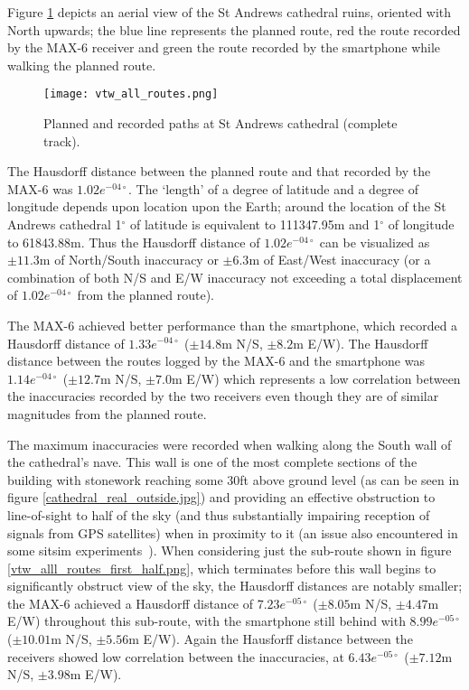 Figure \ref{vtw_all_routes.png} depicts an aerial view of the St Andrews cathedral ruins, oriented with North upwards; the blue line represents the planned route, red the route recorded by the MAX-6 receiver and green the route recorded by the smartphone while walking the planned route.

\begin{figure}[h]
\centering
\texttt{[image: vtw\_all\_routes.png]}
\caption{Planned and recorded paths at St Andrews cathedral (complete track).}
\label{vtw_all_routes.png}
\end{figure}

The Hausdorff distance between the planned route and that recorded by the MAX-6 was $1.02e^{-04\circ}$. The `length' of a degree of latitude and a degree of longitude depends upon location upon the Earth; around the location of the St Andrews cathedral 1$^\circ$ of latitude is equivalent to 111347.95m and 1$^\circ$ of longitude to 61843.88m. Thus the Hausdorff distance of $1.02e^{-04\circ}$ can be visualized as $\pm11.3$m of North/South inaccuracy or $\pm6.3$m of East/West inaccuracy (or a combination of both N/S and E/W inaccuracy not exceeding a total displacement of $1.02e^{-04\circ}$ from the planned route).

The MAX-6 achieved better performance than the smartphone, which recorded a Hausdorff distance of $1.33e^{-04\circ}$ ($\pm14.8$m N/S, $\pm8.2$m E/W). The Hausdorff distance between the routes logged by the MAX-6 and the smartphone was $1.14e^{-04\circ}$ ($\pm12.7$m N/S, $\pm7.0$m E/W) which represents a low correlation between the inaccuracies recorded by the two receivers even though they are of similar magnitudes from the planned route.

The maximum inaccuracies were recorded when walking along the South wall of the cathedral's nave. This wall is one of the most complete sections of the building with stonework reaching some 30ft above ground level (as can be seen in figure \ref{cathedral_real_outside.jpg}) and providing an effective obstruction to line-of-sight to half of the sky (and thus substantially impairing reception of signals from GPS satellites) when in proximity to it (an issue also encountered in some sitsim experiments~\cite{Liestøl2014}). When considering just the sub-route shown in figure \ref{vtw_alll_routes_first_half.png}, which terminates before this wall begins to significantly obstruct view of the sky, the Hausdorff distances are notably smaller; the MAX-6 achieved a Hausdorff distance of $7.23e^{-05\circ}$ ($\pm8.05$m N/S, $\pm4.47$m E/W) throughout this sub-route, with the smartphone still behind with $8.99e^{-05\circ}$ ($\pm10.01$m N/S, $\pm5.56$m E/W). Again the Hausforff distance between the receivers showed low correlation between the inaccuracies, at $6.43e^{-05\circ}$ ($\pm7.12$m N/S, $\pm3.98$m E/W).
 
